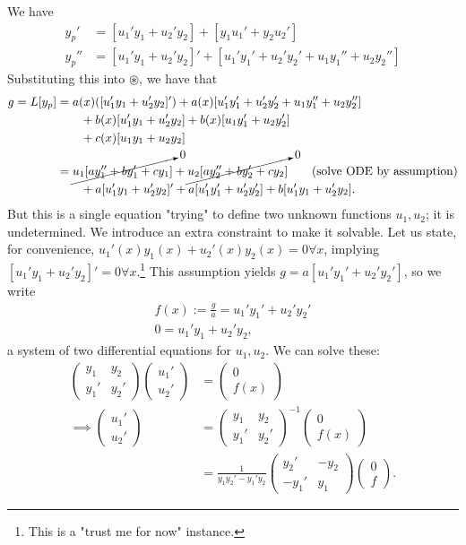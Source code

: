 We have
\begin{align*}
    y_p' &= [u_1'y_1+u_2'y_2]+[y_1u_1'+y_2u_2']\\
    y_p''&=[u_1'y_1+u_2'y_2]'+[u_1'y_1'+u_2'y_2'+u_1y_1''+u_2y_2'']
\end{align*}
Substituting this into $\circledast$, we have that \begin{align*}
    g = L[y_p] &= a(x)([u_1'y_1+u_2'y_2]')+a(x)[u_1'y_1'+u_2'y_2'+u_1y_1''+u_2y_2'']\\
    & \qquad + b(x)[u_1'y_1+u_2'y_2]+b(x)[u_1y_1'+u_2y_2']\\
    & \qquad + c(x)[u_1y_1+u_2y_2]\\
    &=\cancelto{0}{u_1[ay_1''+by_1'+cy_1]}+\cancelto{0}{u_2[ay_2''+by_2'+cy_2]} \qquad \text{(solve ODE by assumption)}\\
    & \qquad +a[u_1'y_1+u_2'y_2]'+a[u_1'y_1'+u_2'y_2']+b[u_1'y_1+u_2'y_2]. 
\end{align*}
But this is a single equation "trying" to define two unknown functions $u_1, u_2$; it is undetermined. We introduce an extra constraint to make it solvable. Let us state, for convenience, $u_1'(x)y_1(x)+u_2'(x)y_2(x)= 0 \forall x$, implying $[u_1'y_1+u_2'y_2]' = 0 \forall x$.\footnote{This is a "trust me for now" instance.}
This assumption yields $g = a[u_1'y_1'+u_2'y_2']$, so we write
\begin{align*}
   f(x):=\frac{g}{a} = u_1'y_1'+u_2'y_2'\\
   0 = u_1'y_1 + u_2'y_2,
\end{align*}
a system of two differential equations for $u_1, u_2$. We can solve these:
\begin{align*}
    \begin{pmatrix}
        y_1 & y_2\\
        y_1' & y_2'
    \end{pmatrix}\begin{pmatrix}
        u_1'\\
        u_2'
    \end{pmatrix} &= \begin{pmatrix}
        0\\
        f(x)
    \end{pmatrix}\\
    \implies \begin{pmatrix}
        u_1'\\
        u_2'
    \end{pmatrix} &= \begin{pmatrix}
        y_1 & y_2\\
        y_1' & y_2'
    \end{pmatrix}^{-1} \begin{pmatrix}
        0\\
        f(x)
    \end{pmatrix}\\
    &= \frac{1}{y_1y_2'-y_1'y_2} \begin{pmatrix}
        y_2' & - y_2\\
        -y_1' & y_1
    \end{pmatrix} \begin{pmatrix}
        0\\
        f
    \end{pmatrix}.
\end{align*}
